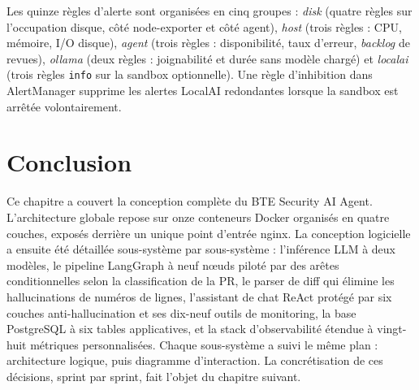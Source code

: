         Les quinze règles d'alerte sont organisées en cinq groupes : \textit{disk} (quatre
        règles sur l'occupation disque, côté node-exporter et côté agent), \textit{host}
        (trois règles : CPU, mémoire, I/O disque), \textit{agent} (trois règles :
        disponibilité, taux d'erreur, \textit{backlog} de revues), \textit{ollama} (deux
        règles : joignabilité et durée sans modèle chargé) et \textit{localai} (trois règles
        \texttt{info} sur la sandbox optionnelle). Une règle d'inhibition dans AlertManager
        supprime les alertes LocalAI redondantes lorsque la sandbox est arrêtée volontairement.

\section*{Conclusion}

Ce chapitre a couvert la conception complète du BTE Security AI Agent. L'architecture
globale repose sur onze conteneurs Docker organisés en quatre couches, exposés derrière
un unique point d'entrée nginx. La conception logicielle a ensuite été détaillée
sous-système par sous-système : l'inférence LLM à deux modèles, le pipeline LangGraph
à neuf nœuds piloté par des arêtes conditionnelles selon la classification de la PR,
le parser de diff qui élimine les hallucinations de numéros de lignes, l'assistant de
chat ReAct protégé par six couches anti-hallucination et ses dix-neuf outils de
monitoring, la base PostgreSQL à six tables applicatives, et la stack d'observabilité
étendue à vingt-huit métriques personnalisées. Chaque sous-système a suivi le même
plan : architecture logique, puis diagramme d'interaction. La concrétisation de ces
décisions, sprint par sprint, fait l'objet du chapitre suivant.

